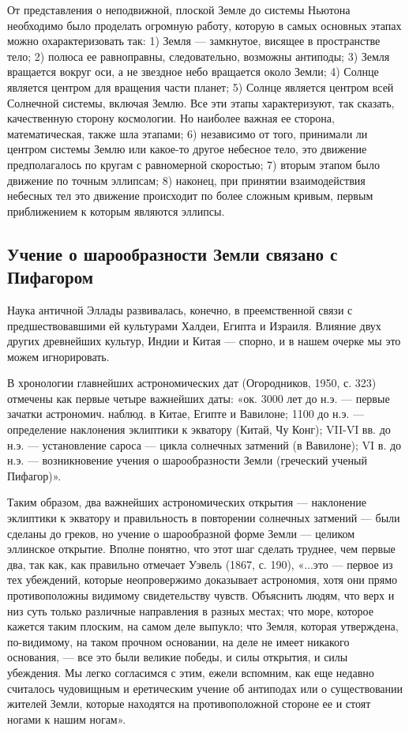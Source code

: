 От представления о неподвижной, плоской Земле до системы Ньютона
необходимо было проделать огромную работу, которую в самых основных
этапах можно охарактеризовать так: 1) Земля --- замкнутое, висящее в
пространстве тело; 2) полюса ее равноправны, следовательно, возможны
антиподы; 3) Земля вращается вокруг оси, а не звездное небо вращается
около Земли; 4) Солнце является центром для вращения части планет; 5)
Солнце является центром всей Солнечной системы, включая Землю. Все эти
этапы характеризуют, так сказать, качественную сторону космологии. Но
наиболее важная ее сторона, математическая, также шла этапами; 6)
независимо от того, принимали ли центром системы Землю или какое-то
другое небесное тело, это движение предполагалось по кругам с
равномерной скоростью; 7) вторым этапом было движение по точным
эллипсам; 8) наконец, при принятии взаимодействия небесных тел это
движение происходит по более сложным кривым, первым приближением к
которым являются эллипсы.

\subsection{Учение о шарообразности Земли связано с Пифагором}

Наука античной Эллады развивалась, конечно, в преемственной связи с
предшествовавшими ей культурами Халдеи, Египта и Израиля. Влияние
двух других древнейших культур, Индии и Китая --- спорно, и в нашем
очерке мы это можем игнорировать.

В хронологии главнейших астрономических дат (Огородников, 1950, с.
323) отмечены как первые четыре важнейших даты: «ок. 3000 лет до н.э.
--- первые зачатки астрономич. наблюд. в Китае, Египте и Вавилоне;
1100 до н.э. --- определение наклонения эклиптики к экватору (Китай,
Чу Конг); VII-VI вв. до н.э. --- установление сароса --- цикла
солнечных затмений (в Вавилоне); VI в. до н.э. --- возникновение
учения о шарообразности Земли (греческий ученый Пифагор)».

Таким образом, два важнейших астрономических открытия --- наклонение
эклиптики к экватору и правильность в повторении солнечных затмений
--- были сделаны до греков, но учение о шарообразной форме Земли ---
целиком эллинское открытие. Вполне понятно, что этот шаг сделать
труднее, чем первые два, так как, как правильно отмечает Уэвель (1867,
с. 190), «...это --- первое из тех убеждений, которые неопровержимо
доказывает астрономия, хотя они прямо противоположны видимому
свидетельству чувств. Объяснить людям, что верх и низ суть только
различные направления в разных местах; что море, которое кажется таким
плоским, на самом деле выпукло; что Земля, которая утверждена,
по-видимому, на таком прочном основании, на деле не имеет никакого
основания, --- все это были великие победы, и силы открытия, и силы
убеждения. Мы легко согласимся с этим, ежели вспомним, как еще недавно
считалось чудовищным и еретическим учение об антиподах или о
существовании жителей Земли, которые находятся на противоположной
стороне ее и стоят ногами к нашим ногам».


